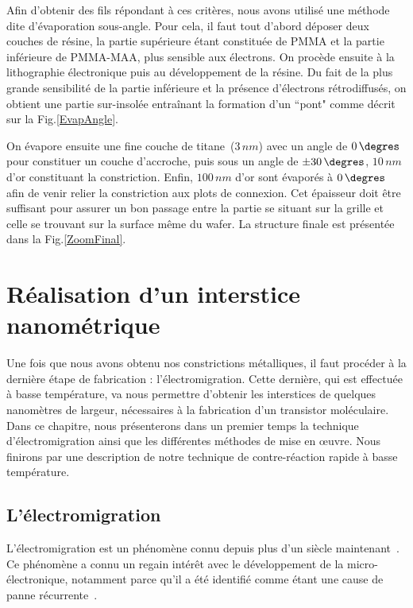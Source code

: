 Afin d'obtenir des fils répondant à ces critères, nous avons utilisé une méthode dite d'évaporation sous-angle. Pour cela, il faut tout d'abord déposer deux couches de résine, la partie supérieure étant constituée de PMMA et la partie inférieure de PMMA-MAA, plus sensible aux électrons. On procède ensuite à la lithographie électronique puis au développement de la résine. Du fait de la plus grande sensibilité de la partie inférieure et la présence d'électrons rétrodiffusés, on obtient une partie sur-insolée entraînant la formation d'un ``pont" comme décrit sur la Fig.\ref{EvapAngle}.

On évapore ensuite une fine couche de titane~(3$\, nm$) avec un angle de $0\,\degres$ pour constituer un couche d'accroche, puis sous un angle de $\pm30\,\degres$, $10\, nm$ d'or  constituant la constriction. Enfin, $100\,nm$ d'or sont évaporés à $0\,\degres$ afin de venir relier la constriction aux plots de connexion. Cet épaisseur doit être suffisant pour assurer un bon passage entre la partie se situant sur la grille et celle se trouvant sur la surface même du wafer. La structure finale est présentée dans la Fig.\ref{ZoomFinal}.



\section{Réalisation d'un interstice nanométrique}
Une fois que nous avons obtenu nos constrictions métalliques, il faut procéder à la dernière étape de fabrication : l'électromigration. Cette dernière, qui est effectuée à basse température, va nous permettre d'obtenir les interstices de quelques nanomètres de largeur, nécessaires à la fabrication d'un transistor moléculaire. Dans ce chapitre, nous présenterons dans un premier temps la technique d'électromigration ainsi que les différentes méthodes de mise en œuvre. Nous finirons par une description de notre technique de contre-réaction rapide à basse température.

\subsection{L'électromigration}
L'électromigration est un phénomène connu depuis plus d'un siècle maintenant~\cite{Gerardin1861}. Ce phénomène a connu un regain intérêt avec le développement de la micro-électronique, notamment parce qu'il a été identifié comme étant une cause de panne récurrente~\cite{Blech1967,Black1969}.

